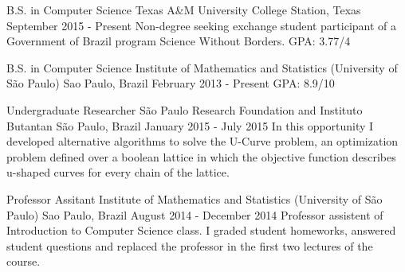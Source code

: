 \documentclass[11pt, a4paper]{awesome-cv-res}
\begin{document}
\makecvheader
\makecvfooter
  {}
  {}
  {\thepage}



\begin{cventries}
\cventry
{B.S. in Computer Science}
{Texas A\&M University}
{College Station, Texas}
{September 2015 - Present}
{Non-degree seeking exchange student participant of a Government of Brazil program Science Without Borders. \newline GPA: 3.77/4}
\newline 
\newline

\cventry
{B.S. in Computer Science} %
{Institute of Mathematics and Statistics (University of São Paulo)} %
{Sao Paulo, Brazil} %
{February 2013 - Present} %
{GPA: 8.9/10}
\end{cventries}

\begin{cventries}
\cventry
{Undergraduate Researcher}
{São Paulo Research Foundation and Instituto Butantan}
{São Paulo, Brazil}
{January 2015 - July 2015}
{In this opportunity I developed alternative algorithms to solve the U-Curve problem, an optimization problem defined over a boolean lattice in which the objective function describes u-shaped curves for every chain of the lattice.}
\newline 
\newline

\cventry
{Professor Assitant} 
{Institute of Mathematics and Statistics (University of São Paulo)} 
{Sao Paulo, Brazil}
{August 2014 - December 2014}
{Professor assistent of Introduction to Computer Science class. I graded student homeworks, answered student questions and replaced the professor in the first two lectures of the course.}
\end{cventries}
\end{document}
